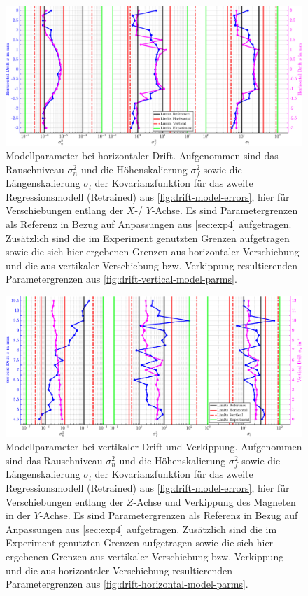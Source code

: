 \clearpage
\begin{figure}[tph]
	\centering
	\includegraphics[width=\linewidth]{chapters/images/4-EuOExp/Drift-Horizontal-Model-Parms}
	\caption[Modellparameter bei horizontaler Drift]{Modellparameter bei horizontaler Drift. Aufgenommen sind das Rauschniveau $\sigma_n^2$ und die Höhenskalierung $\sigma_f^2$ sowie die Längenskalierung $\sigma_l$ der Kovarianzfunktion für das zweite Regressionsmodell (Retrained) aus \autoref{fig:drift-model-errors}, hier für Verschiebungen entlang der $X$-/ $Y$-Achse. Es sind Parametergrenzen als Referenz in Bezug auf Anpassungen aus \autoref{sec:exp4} aufgetragen. Zusätzlich sind die im Experiment genutzten Grenzen aufgetragen sowie die sich hier ergebenen Grenzen aus horizontaler Verschiebung und die aus vertikaler Verschiebung bzw. Verkippung resultierenden Parametergrenzen aus \autoref{fig:drift-vertical-model-parms}.}
	\label{fig:drift-horizontal-model-parms}
\end{figure}


\clearpage
\begin{figure}[tph]
	\centering
	\includegraphics[width=\linewidth]{chapters/images/4-EuOExp/Drift-Vertical-Model-Parms}
	\caption[Modellparameter bei vertikaler Drift und Verkippung]{Modellparameter bei vertikaler Drift und Verkippung. Aufgenommen sind das Rauschniveau $\sigma_n^2$ und die Höhenskalierung $\sigma_f^2$ sowie die Längenskalierung $\sigma_l$ der Kovarianzfunktion für das zweite Regressionsmodell (Retrained) aus \autoref{fig:drift-model-errors}, hier für Verschiebungen entlang der $Z$-Achse und Verkippung des Magneten in der $Y$-Achse. Es sind Parametergrenzen als Referenz in Bezug auf Anpassungen aus \autoref{sec:exp4} aufgetragen. Zusätzlich sind die im Experiment genutzten Grenzen aufgetragen sowie die sich hier ergebenen Grenzen aus vertikaler Verschiebung bzw. Verkippung und die aus horizontaler Verschiebung resultierenden Parametergrenzen aus \autoref{fig:drift-horizontal-model-parms}.}
	\label{fig:drift-vertical-model-parms}
\end{figure}


